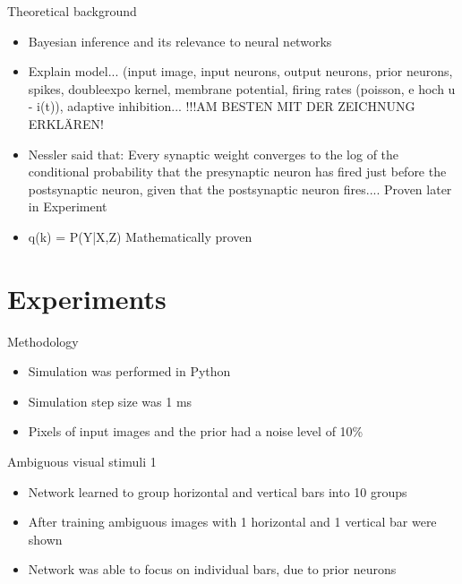 \documentclass[aspectratio=169]{beamer}
\begin{document}
\begin{frame}{Theoretical background}
      \begin{itemize}
        \item Bayesian inference and its relevance to neural networks
        \item Explain model... (input image, input neurons, output neurons, prior neurons, spikes, doubleexpo kernel, membrane potential, firing rates (poisson, e hoch u - i(t)), adaptive inhibition... !!!AM BESTEN MIT DER ZEICHNUNG ERKLÄREN!
         \item Nessler said that: Every synaptic weight converges to the log of the conditional probability that the presynaptic neuron has fired just before the postsynaptic neuron, given that the postsynaptic neuron fires.... Proven later in Experiment
        \item q(k) = P(Y|X,Z) Mathematically proven  

      \end{itemize}
\end{frame}


\section{Experiments}

\begin{frame}{Methodology}
\begin{itemize}
	\item Simulation was performed in Python
	\item Simulation step size was 1 ms
	\item Pixels of input images and the prior had a noise level of 10\%
\end{itemize}
\end{frame}

\begin{frame}{Ambiguous visual stimuli 1}
  \begin{itemize}
    \item Network learned to group horizontal and vertical bars into 10 groups
    \item After training ambiguous images with 1 horizontal and 1 vertical bar were shown
    \item Network was able to focus on individual bars, due to prior neurons
  \end{itemize}
\end{frame}
\end{document}
